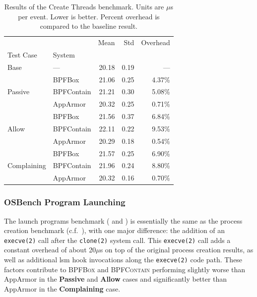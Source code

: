 \documentclass[
  fontsize=12pt,
  titlepage=firstiscover,
  paper=letter,
oneside,
  cleardoublepage=plain,
  parskip=half-,
  DIV=10,
  parindent,
  appendixprefix,
  chapterprefix,
  listof=totoc,
]{scrbook}
\newcommand{\bpfbox}{\textsc{BPFBox}}
\newcommand{\bpfcontain}{\textsc{BPFContain}}
\begin{document}
\begin{table}[ht!]
\centering
\footnotesize
\caption[Results of the Create Threads benchmark]{Results of the Create Threads benchmark. Units are $\mu$s per event. Lower is better. Percent overhead is compared to the baseline result.}
\label{tab:phoronix-create-threads}
\begin{tabular}{llrrr}
\toprule
            &          &   Mean &   Std & Overhead \\
Test Case & System &        &       &          \\
\midrule
Base & --- &  20.18 &  0.19 &      --- \\
\cline{1-5}
\multirow{3}{*}{Passive} & BPFBox &  21.06 &  0.25 &   4.37\% \\
            & BPFContain &  21.21 &  0.30 &   5.08\% \\
            & AppArmor &  20.32 &  0.25 &   0.71\% \\
\cline{1-5}
\multirow{3}{*}{Allow} & BPFBox &  21.56 &  0.37 &   6.84\% \\
            & BPFContain &  22.11 &  0.22 &   9.53\% \\
            & AppArmor &  20.29 &  0.18 &   0.54\% \\
\cline{1-5}
\multirow{3}{*}{Complaining} & BPFBox &  21.57 &  0.25 &   6.90\% \\
            & BPFContain &  21.96 &  0.24 &   8.80\% \\
            & AppArmor &  20.32 &  0.16 &   0.70\% \\
\bottomrule
\end{tabular}
\end{table}


\subsubsection{OSBench Program Launching}

The launch programs benchmark ( and ) is essentially the
same as the process creation benchmark (c.f.\ ), with one
major difference: the addition of an \texttt{execve(2)} call after the \texttt{clone(2)}
system call. This \texttt{execve(2)} call adds a constant overhead of about 20$\mu$s on
top of the original process creation results, as well as additional \gls{lsm} hook
invocations along the \texttt{execve(2)} code path. These factors contribute to \bpfbox{}
and \bpfcontain{} performing slightly worse than AppArmor in the \textbf{Passive} and
\textbf{Allow} cases and significantly better than AppArmor in the \textbf{Complaining}
case.
\end{document}
